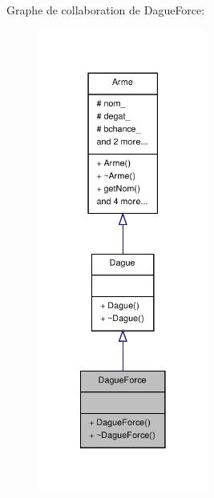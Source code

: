 Graphe de collaboration de Dague\-Force\-:
\nopagebreak
\begin{figure}[H]
\begin{center}
\leavevmode
\includegraphics[width=158pt]{class_dague_force__coll__graph}
\end{center}
\end{figure}
